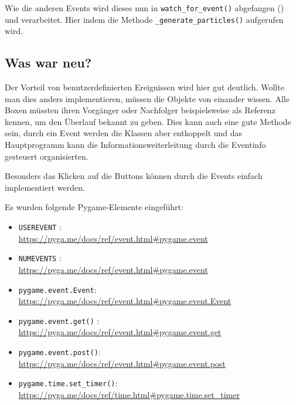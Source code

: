 Wie die anderen Events wird dieses nun in \texttt{watch\_for\_event()} abgefangen () und verarbeitet. Hier indem die Methode \texttt{\_generate\_particles()} aufgerufen wird.


\subsection*{Was war neu?}

Der Vorteil von benutzerdefinierten Ereignissen wird hier gut deutlich. Wollte man dies anders implementieren, müssen die Objekte von einander wissen. Alle Boxen müssten ihren Vorgänger oder Nachfolger beispielsweise als Referenz kennen, um den Überlauf bekannt zu geben. Dies kann auch eine gute Methode sein, durch ein Event werden die Klassen aber entkoppelt und das Hauptprogramm kann die Informationsweiterleitung durch die Eventinfo gesteuert organisierten.

Besonders das Klicken auf die Buttons können durch die Events einfach implementiert werden.


Es wurden folgende Pygame-Elemente eingeführt:

\begin{itemize}
	\item \texttt{USEREVENT}
    :\\
    \url{https://pyga.me/docs/ref/event.html#pygame.event}

    \item \texttt{NUMEVENTS}
    :\\
    \url{https://pyga.me/docs/ref/event.html#pygame.event}

	\item \texttt{pygame.event.Event}:
	\\
	\url{https://pyga.me/docs/ref/event.html#pygame.event.Event}
	
	\item \texttt{pygame.event.get()}
    :\\
    \url{https://pyga.me/docs/ref/event.html#pygame.event.get}

	\item \texttt{pygame.event.post()}:
	\\
	\url{https://pyga.me/docs/ref/event.html#pygame.event.post}
	
	\item \texttt{pygame.time.set\_timer()}:
	\\
	\url{https://pyga.me/docs/ref/time.html#pygame.time.set_timer}

	
\end{itemize}


